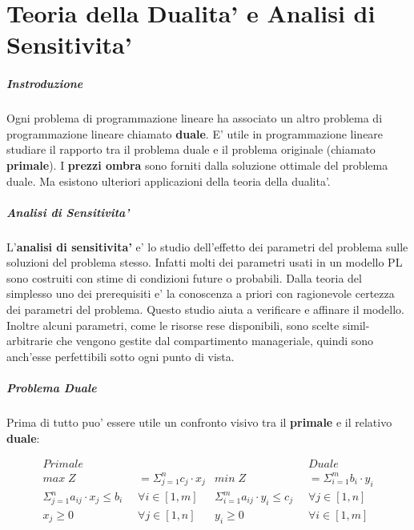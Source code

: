 \chapter{Teoria della Dualita' e Analisi di Sensitivita'}

\paragraph{Instroduzione}

Ogni problema di programmazione lineare ha associato un altro problema di programmazione lineare chiamato \textbf{duale}.
E' utile in programmazione lineare studiare il rapporto tra il problema duale e il problema originale (chiamato \textbf{primale}).
I \textbf{prezzi ombra} sono forniti dalla soluzione ottimale del problema duale.
Ma esistono ulteriori applicazioni della teoria della dualita'.

\paragraph{Analisi di Sensitivita'}

L'\textbf{analisi di sensitivita'} e' lo studio dell'effetto dei parametri del problema sulle soluzioni del problema stesso.
Infatti molti dei parametri usati in un modello PL sono costruiti con stime di condizioni future o probabili.
Dalla teoria del simplesso uno dei prerequisiti e' la conoscenza a priori con ragionevole certezza dei parametri del problema.
Questo studio aiuta a verificare e affinare il modello.
Inoltre alcuni parametri, come le risorse rese disponibili, sono scelte simil-arbitrarie che vengono gestite dal compartimento manageriale, quindi sono anch'esse perfettibili sotto ogni punto di vista.

\paragraph{Problema Duale}

Prima di tutto puo' essere utile un confronto visivo tra il \textbf{primale} e il relativo \textbf{duale}:

\begin{align*}
    Primale &  &  & Duale \\
    max \; Z &= \Sigma ^ n _ {j=1} c_j \cdot x_j &
    min \; Z &= \Sigma ^ m _ {i=1} b_i \cdot y_i \\
    \Sigma ^ n _ {j=1} a_{ij} \cdot x_{j} \leq b_{i} \; \; & \forall i \in [1,m] &
    \Sigma ^ m _ {i=1} a_{ij} \cdot y_{i} \leq c_{j} \; \; & \forall j \in [1,n] \\
    x_j \geq 0 \; \; & \forall j \in [1,n] &
    y_i \geq 0 \; \; & \forall i \in [1,m] \\
\end{align*}

